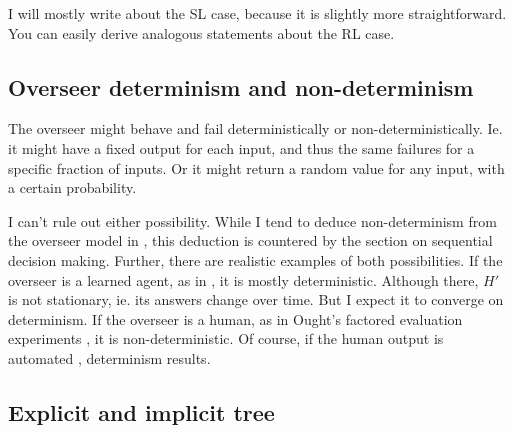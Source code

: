 \documentclass{farlamp}
\begin{document}
I will mostly write about the SL case, because it is slightly more
straightforward. You can easily derive analogous statements about the RL case.


\subsection{Overseer determinism and non-determinism}

The overseer might behave and fail deterministically or non-deterministically.
Ie. it might have a fixed output for each input, and thus the same failures for
a specific fraction of inputs. Or it might return a random value for any input,
with a certain probability.

I can't rule out either possibility. While I tend to deduce non-determinism from
the overseer model in \textcite{ChriRelAmp}, this deduction is countered by the
section on sequential decision making. Further, there are realistic examples of
both possibilities. If the overseer is a learned agent, as in
\textcite{CSASupAmp}, it is mostly deterministic. Although there, $H'$ is not
stationary, ie. its answers change over time. But I expect it to converge on
determinism. If the overseer is a human, as in Ought's factored evaluation
experiments \parencite{StuhDelCog}, it is non-deterministic. Of course, if the
human output is automated \parencite[see][sec. ‘Caching’ f.]{StuhTaxCapAmp},
determinism results.

%
%
%
%


\subsection{Explicit and implicit tree}
\end{document}

